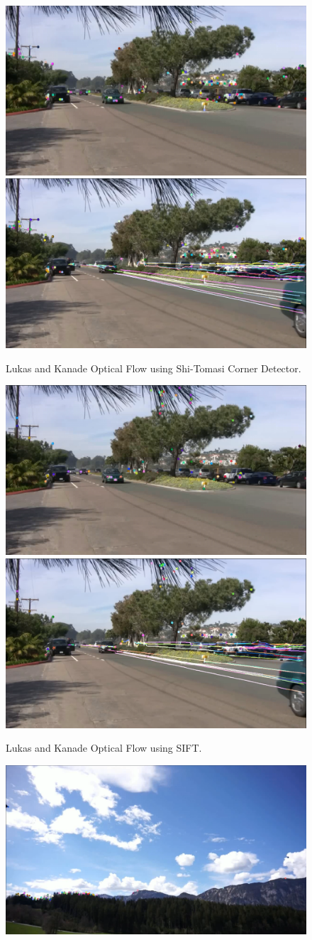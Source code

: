 \documentclass[UTF-8]{article}
\begin{document}
\begin{enumerate}[{Part} a.]
\begin{figure}[H]
	\centering
	\includegraphics[width=0.5\linewidth]{_images/shi-tomasi_cars1}
	\includegraphics[width=0.5\linewidth]{_images/shi-tomasi_cars2}
	\caption{Lukas and Kanade Optical Flow using Shi-Tomasi Corner Detector. }
	\label{fig:shi-tomasicars}
\end{figure}
\begin{figure}[H]
	\centering
	\includegraphics[width=0.5\linewidth]{_images/sift_cars1}
	\includegraphics[width=0.5\linewidth]{_images/sift_cars2}
	\caption{Lukas and Kanade Optical Flow using SIFT. }
	\label{fig:siftcars}
\end{figure}
\begin{figure}[H]
	\centering
	\includegraphics[width=0.9\linewidth]{_images/shi-tomasi_sky1}

\end{figure}
\end{enumerate}
\end{document}
